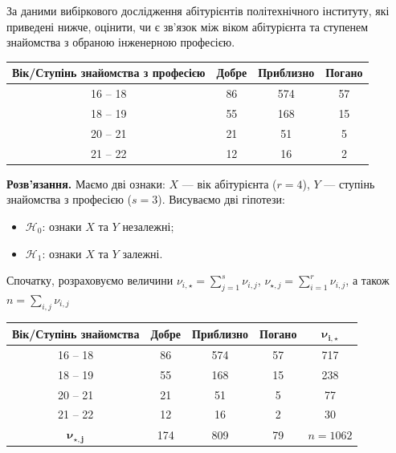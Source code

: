 \documentclass{../hw_template}
\begin{document}
\begin{problem}
    За даними вибіркового дослідження абітурієнтів політехнічного інституту, які
приведені нижче, оцінити, чи є зв’язок між віком абітурієнта та ступенем
знайомства з обраною інженерною професією.

    \begin{center}
        \begin{tabular}{|c|c|c|c|}
            \hline\textbf{Вік/Ступінь знайомства
            з професією} & \textbf{Добре} & \textbf{Приблизно} & \textbf{Погано} \\
            \hline
            16 – 18 & 86 & 574 & 57 \\
            18 – 19 & 55 & 168 & 15 \\
            20 – 21 & 21 & 51 & 5 \\
            21 – 22 & 12 & 16 & 2 \\
            \hline
        \end{tabular}
    \end{center}
\end{problem}

\textbf{Розв'язання.} Маємо дві ознаки: $X$ --- вік абітурієнта ($r=4$), $Y$ ---
ступінь знайомства з професією ($s=3$). Висуваємо дві гіпотези:
\begin{itemize}
    \item $\mathcal{H}_0$: ознаки $X$ та $Y$ незалежні;
    \item $\mathcal{H}_1$: ознаки $X$ та $Y$ залежні.
\end{itemize}

Спочатку, розраховуємо величини $\nu_{i,\star} = \sum_{j=1}^s\nu_{i,j}$, $\nu_{\star,j} = \sum_{i=1}^r \nu_{i,j}$, а також $n=\sum_{i,j}\nu_{i,j}$
\begin{center}
    \begin{tabular}{c|ccc|c}
        \hline\textbf{Вік/Ступінь знайомства} & \textbf{Добре} &
        \textbf{Приблизно} & \textbf{Погано} & $\boldsymbol{\nu_{i,\star}}$ \\
        \hline
        16 – 18 & 86 & 574 & 57 & 717 \\
        18 – 19 & 55 & 168 & 15 & 238 \\
        20 – 21 & 21 & 51 & 5 & 77 \\
        21 – 22 & 12 & 16 & 2 & 30 \\ \hline
        $\boldsymbol{\nu_{\star,j}}$ & 174 & 809 & 79 & $n=1062$
    \end{tabular}
\end{center}
\end{document}
